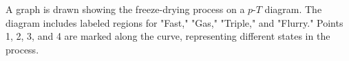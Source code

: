 A graph is drawn showing the freeze-drying process on a \( p \)-\( T \) diagram. The diagram includes labeled regions for "Fast," "Gas," "Triple," and "Flurry." Points 1, 2, 3, and 4 are marked along the curve, representing different states in the process.